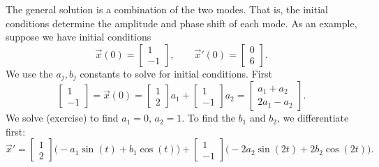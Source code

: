 \documentclass{ximera}
\begin{document}
\begin{exampleSol}
    The general solution is a combination of the two modes.  That is, the initial conditions determine the amplitude and phase shift of each mode. As an example, suppose we have initial conditions
    \begin{equation*}
        \vec{x}(0) = 
        \begin{bmatrix} 
            1 \\ 
            -1 
        \end{bmatrix}
        , \qquad \vec{x}'(0) = 
        \begin{bmatrix} 
            0 \\ 
            6 
        \end{bmatrix} .
    \end{equation*}
    We use the $a_j, b_j$ constants to solve for initial conditions.  First
    \begin{equation*}
        \begin{bmatrix} 
            1 \\ 
            -1 
        \end{bmatrix}
        = \vec{x}(0) = 
        \begin{bmatrix} 
            1 \\ 
            2 
        \end{bmatrix}
        a_1 +
        \begin{bmatrix} 
            1 \\ 
            -1 
        \end{bmatrix}
        a_2 =
        \begin{bmatrix} 
            a_1+a_2 \\
            2a_1 - a_2 
        \end{bmatrix} .
    \end{equation*}
    We solve (exercise) to find $a_1 = 0$, $a_2 = 1$. To find the $b_1$ and $b_2$, we differentiate first:
    \begin{equation*}
        {\vec{x}}' = 
        \begin{bmatrix} 
            1 \\ 
            2 
        \end{bmatrix}
        \bigl( - a_1 \sin (t) + b_1 \cos (t) \bigr) +
        \begin{bmatrix} 
            1 \\ 
            -1 
        \end{bmatrix}
        \bigl( - 2a_2 \sin (2t) + 2 b_2 \cos (2t) \bigr) .
    \end{equation*}

\end{exampleSol}
\end{document}
